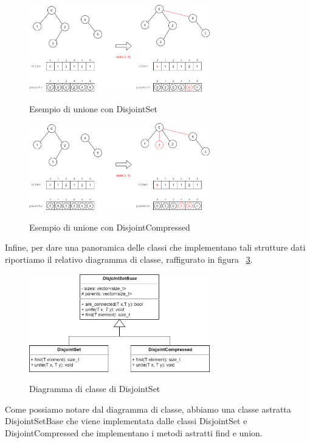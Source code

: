 \begin{figure}[h]
	\caption{Esempio di unione con DisjointSet}
	\centering
	\includegraphics[width=0.7\textwidth]{./images/DisjointSetExample.png}
	\label{fig:disjointset example}
\end{figure}

\begin{figure}[h]
	\caption{Esempio di unione con DisjointCompressed}
	\centering
	\includegraphics[width=0.7\textwidth]{./images/DisjointSetCompressedExample.png}
	\label{fig:disjointset path c example}
\end{figure}

Infine, per dare una panoramica delle classi che implementano tali strutture dati riportiamo il relativo diagramma di classe, raffigurato in figura ~\ref{fig:DisjointSet Class}.

\begin{figure}[h]
	\caption{Diagramma di classe di DisjointSet}
	\centering
	\includegraphics[width=0.7\textwidth]{./images/DisjointSetClass.png}
	\label{fig:DisjointSet Class}
\end{figure}

Come possiamo notare dal diagramma di classe, abbiamo una classe astratta DisjointSetBase che viene implementata dalle classi DisjointSet e DisjointCompressed che implementano i metodi astratti find e union.


